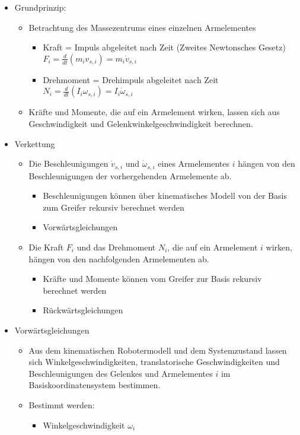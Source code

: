 \documentclass[paper=a4, fontsize=11pt]{scrartcl} %
\numberwithin{equation}{section} %
\numberwithin{figure}{section} %
\numberwithin{table}{section} %
\begin{document}
\begin{itemize}
\item Grundprinzip:
\begin{itemize}
\item Betrachtung des Massezentrums eines einzelnen Armelementes
\begin{itemize}
\item Kraft = Impuls abgeleitet nach Zeit (Zweites Newtonsches Gesetz) $F_i = \frac{d}{dt} (m_i v_{s,i}) = m_i \dot v_{s,i}$
\item Drehmoment = Drehimpuls abgeleitet nach Zeit $N_i = \frac{d}{dt}(I_i \omega_{s,i}) = I_i \dot \omega_{s,i}$
\end{itemize}
\item Kräfte und Momente, die auf ein Armelement wirken, lassen sich aus Geschwindigkeit und Gelenkwinkelgeschwindigkeit berechnen.
\end{itemize}
\item Verkettung
\begin{itemize}
\item Die Beschleunigungen $\dot v_{s,i}$ und $\dot \omega_{s,i}$ eines Armelementes $i$ hängen von den Beschleunigungen der vorhergehenden Armelemente ab.
\begin{itemize}
\item Beschleunigungen können über kinematisches Modell von der Basis zum Greifer rekursiv berechnet werden
\item Vorwärtsgleichungen
\end{itemize}
\item Die Kraft $F_i$ und das Drehmoment $N_i$, die auf ein Armelement $i$ wirken, hängen von den nachfolgenden Armelementen ab.
\begin{itemize}
\item Kräfte und Momente können vom Greifer zur Basis rekursiv berechnet werden
\item Rückwärtsgleichungen
\end{itemize}
\end{itemize}
\item Vorwärtsgleichungen
\begin{itemize}
\item Aus dem kinematischen Robotermodell und dem Systemzustand lassen sich Winkelgeschwindigkeiten, translatorische Geschwindigkeiten und Beschleunigungen des Gelenkes und Armelementes $i$ im Basiskoordinatensystem bestimmen.
\item Bestimmt werden:
\begin{itemize}
\item Winkelgeschwindigkeit $\omega_i$

\end{itemize}
\end{itemize}
\end{itemize}
\end{document}
